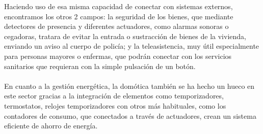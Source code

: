 Haciendo uso de esa misma capacidad de conectar con sistemas externos, encontramos los otros 2 campos: la seguridad de los bienes, que mediante detectores de presencia y diferentes actuadores, como alarmas sonoras o cegadoras, tratara de evitar la entrada o sustracción de bienes de la vivienda, enviando un aviso al cuerpo de policía; y la teleasistencia, muy útil especialmente para personas mayores o enfermas, que podrán conectar con los servicios sanitarios que requieran con la simple pulsación de un botón.\\\\
En cuanto a la gestión energética, la domótica también se ha hecho un hueco en este sector gracias a la integración de elementos como temporizadores, termostatos, relojes temporizadores con otros más habituales, como los contadores de consumo, que conectados a través de actuadores, crean un sistema eficiente de ahorro de energía.\\\\

